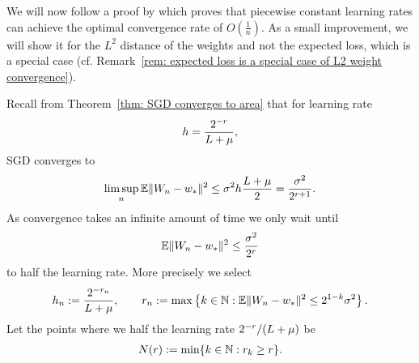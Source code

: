 We will now follow a proof by \textcite[pp. 27-28]{bottouOptimizationMethodsLargeScale2018}
which proves that piecewise constant learning rates can achieve the optimal
convergence rate of \(O(\tfrac1n)\). As a small improvement, we will 
show it for the \(L^2\) distance of the weights and not the expected loss, which
is a special case (cf.  Remark~\ref{rem: expected loss is a special case of L2
weight convergence}).

Recall from Theorem~\ref{thm: SGD converges to area} that for learning rate
\begin{align*}
	h = \frac{2^{-r}}{L+\mu},
\end{align*}
SGD converges to
\begin{align*}
	\limsup_{n}\mathbb{E}\|W_n - w_*\|^2
	\le \sigma^2 h \frac{L+\mu}{2} = \frac{\sigma^2}{2^{r+1}}.
\end{align*}
As convergence takes an infinite amount of time we only wait until
\begin{align*}
	\mathbb{E}\|W_n -w_*\|^2 \le \frac{\sigma^2}{2^r}
\end{align*}
to half the learning rate. More precisely we select 
\begin{align}\label{eq: piecewise constant learning rates}
	h_n := \frac{2^{-r_n}}{L+\mu},
	\qquad	
	r_n := \max\left\{k\in\mathbb{N} : \mathbb{E}\|W_n-w_*\|^2 \le 2^{1-k}\sigma^2\right\}.
\end{align}
Let the points where we half the learning rate
\(2^{-r}/(L+\mu)\) be 
\begin{align*}
	N(r) := \min\{k\in\mathbb{N} : r_k \ge r\}.
\end{align*}

